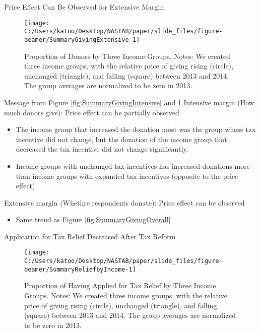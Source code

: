 \documentclass[
  ignorenonframetext,
  aspectratio=169,
]{beamer}
\providecommand{\tightlist}{%
  \setlength{\itemsep}{0pt}\setlength{\parskip}{0pt}}
\begin{document}
\begin{frame}{Price Effect Can Be Observed for Extensive Margin}
\protect\hypertarget{price-effect-can-be-observed-for-extensive-margin}{}
\begin{figure}[t]

{\centering \texttt{[image: C:/Users/katoo/Desktop/NASTAB/paper/slide\_files/figure-beamer/SummaryGivingExtensive-1]} 

}

\caption{Proportion of Donors by Three Income Groups. Notes: We created three income groups, with the relative price of giving rising (circle), unchanged (triangle), and falling (square) between 2013 and 2014. The group averages are normalized to be zero in 2013.}\label{fig:SummaryGivingExtensive}
\end{figure}
\end{frame}

\begin{frame}{Message from Figure \ref{fig:SummaryGivingIntensive} and \ref{fig:SummaryGivingExtensive}}
\protect\hypertarget{message-from-figure-reffigsummarygivingintensive-and-reffigsummarygivingextensive}{}
Intensive margin (How much donors give): Price effect can be partially observed

\begin{itemize}
\tightlist
\item
  The income group that increased the donation most was the group whose tax incentive did not change, but the donation of the income group that decreased the tax incentive did not change significantly.
\item
  Income groups with unchanged tax incentives has increased donations more than income groups with expanded tax incentives (opposite to the price effect).
\end{itemize}

Extensive margin (Whethre respondents donate): Price effect can be observed

\begin{itemize}
\tightlist
\item
  Same trend as Figure \ref{fig:SummaryGivingOverall}
\end{itemize}
\end{frame}

\begin{frame}{Application for Tax Relief Decreased After Tax Reform}
\protect\hypertarget{application-for-tax-relief-decreased-after-tax-reform}{}
\begin{figure}[t]

{\centering \texttt{[image: C:/Users/katoo/Desktop/NASTAB/paper/slide\_files/figure-beamer/SummaryReliefbyIncome-1]} 

}

\caption{Proportion of Having Applied for Tax Relief by Three Income Groups. Notes: We created three income groups, with the relative price of giving rising (circle), unchanged (triangle), and falling (square) between 2013 and 2014. The group averages are normalized to be zero in 2013.}\label{fig:SummaryReliefbyIncome}
\end{figure}
\end{frame}
\end{document}

